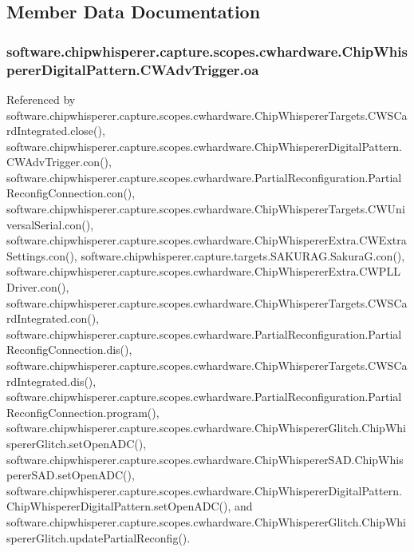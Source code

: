 \subsection{Member Data Documentation}
\hypertarget{classsoftware_1_1chipwhisperer_1_1capture_1_1scopes_1_1cwhardware_1_1ChipWhispererDigitalPattern_1_1CWAdvTrigger_af26d1fad8d0ca052f1b915eb5de64c37}{}
\subsubsection[{oa}]{\setlength{\rightskip}{0pt plus 5cm}software.\+chipwhisperer.\+capture.\+scopes.\+cwhardware.\+Chip\+Whisperer\+Digital\+Pattern.\+C\+W\+Adv\+Trigger.\+oa}\label{classsoftware_1_1chipwhisperer_1_1capture_1_1scopes_1_1cwhardware_1_1ChipWhispererDigitalPattern_1_1CWAdvTrigger_af26d1fad8d0ca052f1b915eb5de64c37}


Referenced by software.\+chipwhisperer.\+capture.\+scopes.\+cwhardware.\+Chip\+Whisperer\+Targets.\+C\+W\+S\+Card\+Integrated.\+close(), software.\+chipwhisperer.\+capture.\+scopes.\+cwhardware.\+Chip\+Whisperer\+Digital\+Pattern.\+C\+W\+Adv\+Trigger.\+con(), software.\+chipwhisperer.\+capture.\+scopes.\+cwhardware.\+Partial\+Reconfiguration.\+Partial\+Reconfig\+Connection.\+con(), software.\+chipwhisperer.\+capture.\+scopes.\+cwhardware.\+Chip\+Whisperer\+Targets.\+C\+W\+Universal\+Serial.\+con(), software.\+chipwhisperer.\+capture.\+scopes.\+cwhardware.\+Chip\+Whisperer\+Extra.\+C\+W\+Extra\+Settings.\+con(), software.\+chipwhisperer.\+capture.\+targets.\+S\+A\+K\+U\+R\+A\+G.\+Sakura\+G.\+con(), software.\+chipwhisperer.\+capture.\+scopes.\+cwhardware.\+Chip\+Whisperer\+Extra.\+C\+W\+P\+L\+L\+Driver.\+con(), software.\+chipwhisperer.\+capture.\+scopes.\+cwhardware.\+Chip\+Whisperer\+Targets.\+C\+W\+S\+Card\+Integrated.\+con(), software.\+chipwhisperer.\+capture.\+scopes.\+cwhardware.\+Partial\+Reconfiguration.\+Partial\+Reconfig\+Connection.\+dis(), software.\+chipwhisperer.\+capture.\+scopes.\+cwhardware.\+Chip\+Whisperer\+Targets.\+C\+W\+S\+Card\+Integrated.\+dis(), software.\+chipwhisperer.\+capture.\+scopes.\+cwhardware.\+Partial\+Reconfiguration.\+Partial\+Reconfig\+Connection.\+program(), software.\+chipwhisperer.\+capture.\+scopes.\+cwhardware.\+Chip\+Whisperer\+Glitch.\+Chip\+Whisperer\+Glitch.\+set\+Open\+A\+D\+C(), software.\+chipwhisperer.\+capture.\+scopes.\+cwhardware.\+Chip\+Whisperer\+S\+A\+D.\+Chip\+Whisperer\+S\+A\+D.\+set\+Open\+A\+D\+C(), software.\+chipwhisperer.\+capture.\+scopes.\+cwhardware.\+Chip\+Whisperer\+Digital\+Pattern.\+Chip\+Whisperer\+Digital\+Pattern.\+set\+Open\+A\+D\+C(), and software.\+chipwhisperer.\+capture.\+scopes.\+cwhardware.\+Chip\+Whisperer\+Glitch.\+Chip\+Whisperer\+Glitch.\+update\+Partial\+Reconfig().



